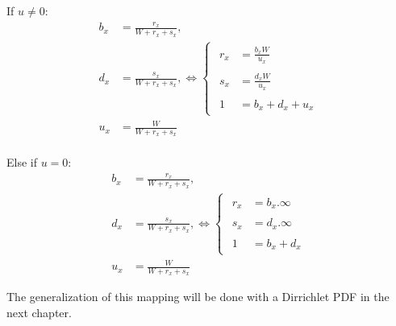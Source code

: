 \documentclass[a4paper,12pt]{article}
\theoremstyle{definition}
\numberwithin{equation}{section}
\begin{document}
If $u \neq 0$: 
\begin{equation}\
    \begin{aligned}
		b_x &= \frac{r_x}{W+r_x+s_x}{,} \\
		d_x &= \frac{s_x}{W+r_x+s_x}{,} \iff 
		\begin{cases}
		    \begin{aligned}
		        r_x &= \frac{b_x W}{u_x} \\ \\
    		    s_x &= \frac{d_x W}{u_x} \\ \\
    		    1   &= b_x + d_x + u_x    
		    \end{aligned}
    	\end{cases} \\
        u_x &= \frac{W}{W+r_x+s_x}
    \end{aligned}
\end{equation}
\\
Else if $u = 0$: 
\begin{equation}\
    \begin{aligned}
		b_x &= \frac{r_x}{W+r_x+s_x}{,} \\
		d_x &= \frac{s_x}{W+r_x+s_x}{,} \iff 
		\begin{cases}
		    \begin{aligned}
		        r_x &= b_x . \infty \\ \\
    		    s_x &= d_x . \infty \\ \\
    		    1   &= b_x + d_x   
		    \end{aligned}
    	\end{cases} \\
        u_x &= \frac{W}{W+r_x+s_x}
    \end{aligned}
\end{equation}

The generalization of this mapping will be done with a Dirrichlet PDF in the next chapter.
\end{document}
